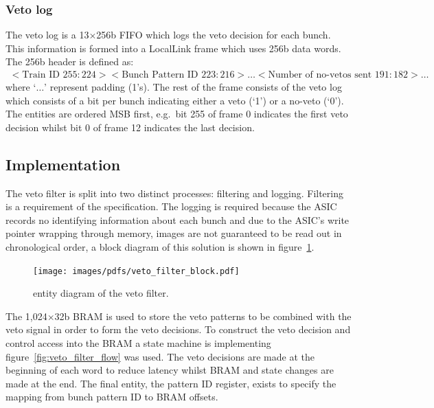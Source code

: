 \subsubsection{Veto log} %
\label{sub:veto_locallink}
The veto log is a 13\( \times \)256b FIFO which logs the veto decision for each bunch. This information is formed into a LocalLink frame which uses 256b data words. The 256b header is defined as:
\begin{align}\label{fmt:ll_header}
  <\text{Train ID } 255:224><\text{Bunch Pattern ID } 223:216>\ldots<\text{Number of no-vetos sent } 191:182> \ldots
\end{align}
where `\( \dots \)' represent padding (1's). The rest of the frame consists of the veto log which consists of a bit per bunch indicating either a veto (`1') or a no-veto (`0'). The entities are ordered MSB first, e.g.\ bit 255 of frame 0 indicates the first veto decision whilst bit 0 of frame 12 indicates the last decision. 
\subsection{Implementation} %
\label{sub:veto_implementation}
The veto filter is split into two distinct processes: filtering and logging. Filtering is a requirement of the specification. The logging is required because the ASIC records no identifying information about each bunch and due to the ASIC's write pointer wrapping through memory, images are not guaranteed to be read out in chronological order, a block diagram of this solution is shown in figure~\ref{fig:veto_filter_entity}.
    
\begin{figure}[htbp]
  \centering
  \texttt{[image: images/pdfs/veto\_filter\_block.pdf]}
  \caption{entity diagram of the veto filter.}
  \label{fig:veto_filter_entity}
\end{figure}
    
The  1,024\( \times \)32b BRAM is used to store the veto patterns to be combined with the veto signal in order to form the veto decisions. To construct the veto decision and control access into the BRAM a state machine is implementing figure~\ref{fig:veto_filter_flow} was used. The veto decisions are made at the beginning of each word to reduce latency whilst BRAM and state changes are made at the end. The final entity, the pattern ID register, exists to specify the mapping from bunch pattern ID to BRAM offsets.
    

